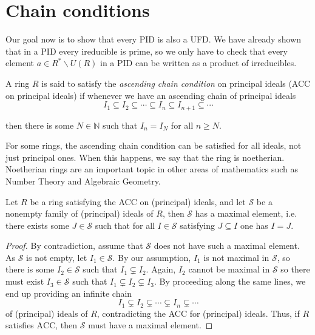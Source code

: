 \section{Chain conditions}

Our goal now is to show that every PID is also a UFD. We have already shown that in a PID every ireducible is prime, so we only have to check that every element $a \in R^{*} \backslash U(R)$ in a PID can be written as a product of irreducibles.

\begin{definition}
    A ring $R$ is said to satisfy the {\it ascending chain condition} on principal ideals (ACC on principal ideals) if whenever we have an ascending chain of principal ideals
    $$
    I_{1} \subseteq I_{2} \subseteq \cdots \subseteq I_{n} \subseteq I_{n+1} \subseteq \cdots
    $$
    
    then there is some $N \in \mathbb{N}$ such that $I_{n}=I_{N}$ for all $n \geq N$.
\end{definition} 

\begin{remark}
    For some rings, the ascending chain condition can be satisfied for all ideals, not just principal ones. When this happens, we say that the ring is noetherian. Noetherian rings are an important topic in other areas of mathematics such as Number Theory and Algebraic Geometry.
\end{remark} 

\begin{proposition}
    Let $R$ be a ring satisfying the ACC on (principal) ideals, and let $\mathcal{S}$ be a nonempty family of (principal) ideals of $R$, then $\mathcal{S}$ has a maximal element, i.e. there exists some $J \in \mathcal{S}$ such that for all $I \in \mathcal{S}$ satisfying $J \subseteq I$ one has $I=J$.
\end{proposition}
\begin{proof}
    By contradiction, assume that $\mathcal{S}$ does not have such a maximal element. As $\mathcal{S}$ is not empty, let $I_{1} \in \mathcal{S}$. By our assumption, $I_{1}$ is not maximal in $\mathcal{S}$, so there is some $I_{2} \in \mathcal{S}$ such that $I_{1} \subsetneq I_{2}$. Again, $I_{2}$ cannot be maximal in $\mathcal{S}$ so there must exist $I_{3} \in \mathcal{S}$ such that $I_{1} \subsetneq I_{2} \subsetneq I_{3}$. By proceeding along the same lines, we end up providing an infinite chain
    $$
    I_{1} \subsetneq I_{2} \subsetneq \cdots \subsetneq I_{n} \subsetneq \cdots
    $$
    of (principal) ideals of $R$, contradicting the ACC for (principal) ideals. Thus, if $R$ satisfies $\mathrm{ACC}$, then $\mathcal{S}$ must have a maximal element.
\end{proof} 

